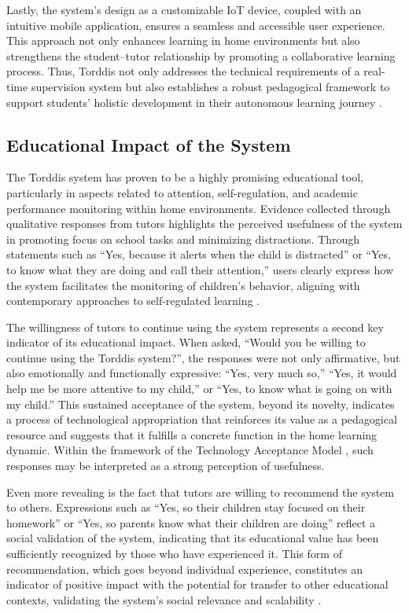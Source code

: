                 Lastly, the system's design as a customizable IoT device, coupled with an intuitive mobile application, ensures a seamless and accessible user experience. This approach not only enhances learning in home environments but also strengthens the student–tutor relationship by promoting a collaborative learning process. Thus, Torddis not only addresses the technical requirements of a real-time supervision system but also establishes a robust pedagogical framework to support students’ holistic development in their autonomous learning journey \citep{Li2024Systematic}.
                
                \subsection{Educational Impact of the System}
                The Torddis system has proven to be a highly promising educational tool, particularly in aspects related to attention, self-regulation, and academic performance monitoring within home environments. Evidence collected through qualitative responses from tutors highlights the perceived usefulness of the system in promoting focus on school tasks and minimizing distractions. Through statements such as “Yes, because it alerts when the child is distracted” or “Yes, to know what they are doing and call their attention,” users clearly express how the system facilitates the monitoring of children's behavior, aligning with contemporary approaches to self-regulated learning \citep{Zimmerman2000Attaining}.
                
                The willingness of tutors to continue using the system represents a second key indicator of its educational impact. When asked, “Would you be willing to continue using the Torddis system?”, the responses were not only affirmative, but also emotionally and functionally expressive: “Yes, very much so,” “Yes, it would help me be more attentive to my child,” or “Yes, to know what is going on with my child.” This sustained acceptance of the system, beyond its novelty, indicates a process of technological appropriation that reinforces its value as a pedagogical resource and suggests that it fulfills a concrete function in the home learning dynamic. Within the framework of the Technology Acceptance Model \citep{Davis1989Management}, such responses may be interpreted as a strong perception of usefulness.
                
                Even more revealing is the fact that tutors are willing to recommend the system to others. Expressions such as “Yes, so their children stay focused on their homework” or “Yes, so parents know what their children are doing” reflect a social validation of the system, indicating that its educational value has been sufficiently recognized by those who have experienced it. This form of recommendation, which goes beyond individual experience, constitutes an indicator of positive impact with the potential for transfer to other educational contexts, validating the system’s social relevance and scalability \citep{Panadero2017Review}.
                

